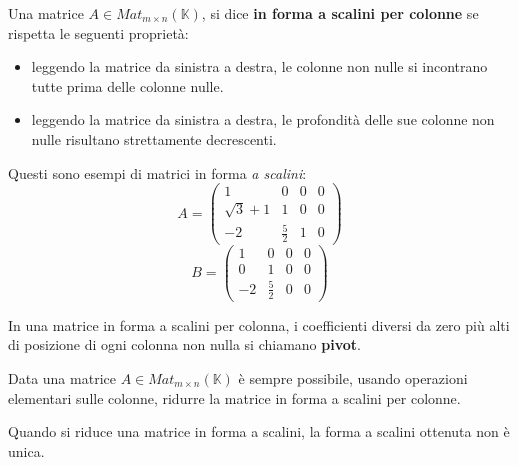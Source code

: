 \begin{definition}
	Una matrice $A \in Mat_{m \times n}(\mathbb{K})$, si dice
	\textbf{in forma a scalini per colonne} se rispetta le seguenti propriet\`a:
	\begin{itemize}
		\item leggendo la matrice da sinistra a destra, le colonne non nulle si
		      incontrano tutte prima delle colonne nulle.
		\item leggendo la matrice da sinistra a destra, le profondit\`a
		      delle sue colonne non nulle risultano strettamente
		      decrescenti.
	\end{itemize}
\end{definition}

\begin{example}
	Questi sono esempi di matrici in forma \emph{a scalini}:
	\begin{equation*}
		A = \begin{pmatrix}
			1            & 0           & 0 & 0 \\
			\sqrt{3} + 1 & 1           & 0 & 0 \\
			-2           & \frac{5}{2} & 1 & 0
		\end{pmatrix}
	\end{equation*}
	\begin{equation*}
		B = \begin{pmatrix}
			1  & 0           & 0 & 0 \\
			0  & 1           & 0 & 0 \\
			-2 & \frac{5}{2} & 0 & 0
		\end{pmatrix}
	\end{equation*}
\end{example}

\begin{definition}
	In una matrice in forma a scalini per colonna, i coefficienti diversi
	da zero pi\`u alti di posizione di ogni colonna non nulla si
	chiamano \textbf{pivot}.
\end{definition}

\begin{theorem}
	Data una matrice $A \in Mat_{m \times n}(\mathbb{K})$ \`e sempre
	possibile, usando operazioni elementari sulle colonne, ridurre la
	matrice in forma a scalini per colonne.
\end{theorem}

\begin{observation}
	Quando si riduce una matrice in forma a scalini, la forma a scalini
	ottenuta non \`e unica.
\end{observation}


